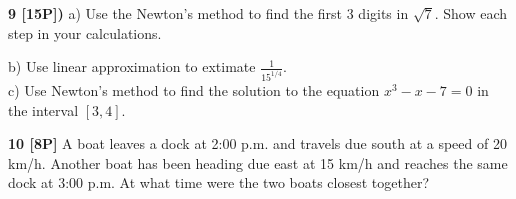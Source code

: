 \documentclass[12pt]{article}
\begin{document}
{\bf 9 [15P])} a) Use the Newton's method to
find the first 3 digits in $\displaystyle{\sqrt{7}}$.
{ Show each step in your calculations.}
\\
\hfill
{}

\vspace{.2in}

b) Use linear approximation to extimate
$\displaystyle{\frac{1}{15^{1/4}}}$.
\\ %

c) Use Newton's method to find the solution
to the equation $\displaystyle{x^3-x-7= 0}$ in
the interval $\displaystyle{[3,4]}$.



\vspace{.2in}

{\bf 10 [8P]} A boat leaves a dock at 2:00 p.m. and travels due south at a speed of
20 km/h. Another boat has been heading due east at 15 km/h and reaches the same dock at
3:00 p.m. At what time were the two boats closest together?
  
\end{document}
